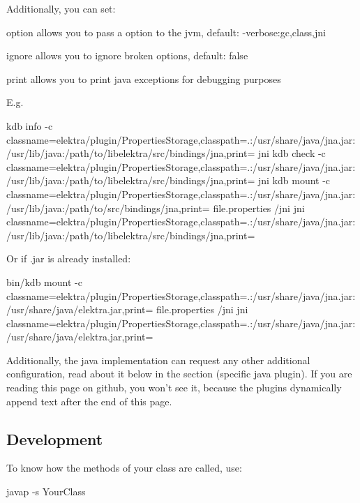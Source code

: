 Additionally, you can set\+:


\begin{DoxyItemize}
\item option allows you to pass a option to the jvm, default\+: {\ttfamily -\/verbose\+:gc,class,jni}
\item ignore allows you to ignore broken options, default\+: {\ttfamily false}
\item print allows you to print java exceptions for debugging purposes
\end{DoxyItemize}

E.\+g. \begin{DoxyVerb}kdb info -c classname=elektra/plugin/PropertiesStorage,classpath=.:/usr/share/java/jna.jar:/usr/lib/java:/path/to/libelektra/src/bindings/jna,print= jni
kdb check -c classname=elektra/plugin/PropertiesStorage,classpath=.:/usr/share/java/jna.jar:/usr/lib/java:/path/to/libelektra/src/bindings/jna,print= jni
kdb mount -c classname=elektra/plugin/PropertiesStorage,classpath=.:/usr/share/java/jna.jar:/usr/lib/java:/path/to/src/bindings/jna,print= file.properties /jni jni classname=elektra/plugin/PropertiesStorage,classpath=.:/usr/share/java/jna.jar:/usr/lib/java:/path/to/libelektra/src/bindings/jna,print=
\end{DoxyVerb}


Or if {\ttfamily .jar} is already installed\+: \begin{DoxyVerb}bin/kdb mount -c classname=elektra/plugin/PropertiesStorage,classpath=.:/usr/share/java/jna.jar:/usr/share/java/elektra.jar,print= file.properties /jni jni classname=elektra/plugin/PropertiesStorage,classpath=.:/usr/share/java/jna.jar:/usr/share/java/elektra.jar,print=
\end{DoxyVerb}


Additionally, the java implementation can request any other additional configuration, read about it below in the section (specific java plugin). If you are reading this page on github, you won't see it, because the plugins dynamically append text after the end of this page.

\subsection*{Development}

To know how the methods of your class are called, use\+: \begin{DoxyVerb}javap -s YourClass
\end{DoxyVerb}


